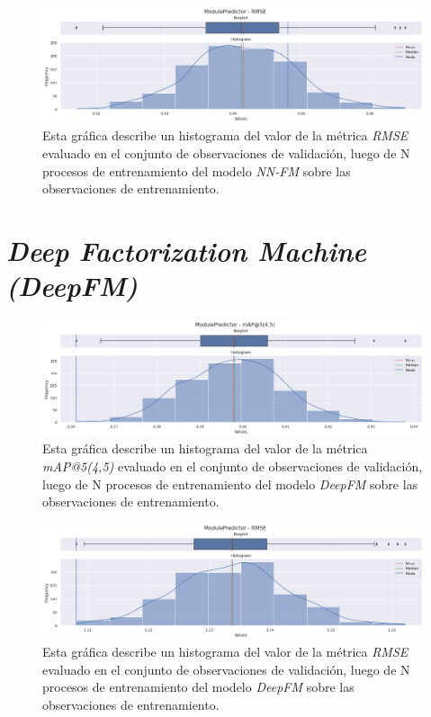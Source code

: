 \documentclass[11pt,a4paper,twoside]{thesis}
\begin{document}
\begin{figure}[h!]
	\centering
	\includegraphics[width=15cm]{./images/metrics-NN-FM-RMSE.png}
	\caption{Esta gráfica describe un histograma del valor de la métrica \textit{RMSE} evaluado en el conjunto de observaciones de validación, luego de N procesos de entrenamiento del modelo \textit{NN-FM} sobre las observaciones de entrenamiento.}
\end{figure}




\clearpage

\section{\textit{Deep Factorization Machine (DeepFM)}}

\begin{figure}[h!]
	\centering
	\includegraphics[width=15cm]{./images/metrics-DeepFM-mapk.png}
	\caption{Esta gráfica describe un histograma del valor de la métrica \textit{mAP@5(4,5)} evaluado en el conjunto de observaciones de validación, luego de N procesos de entrenamiento del modelo \textit{DeepFM} sobre las observaciones de entrenamiento.}
\end{figure}

\begin{figure}[h!]
	\centering
	\includegraphics[width=15cm]{./images/metrics-DeepFM-RMSE.png}
	\caption{Esta gráfica describe un histograma del valor de la métrica \textit{RMSE} evaluado en el conjunto de observaciones de validación, luego de N procesos de entrenamiento del modelo \textit{DeepFM} sobre las observaciones de entrenamiento.}
\end{figure}
\end{document}

